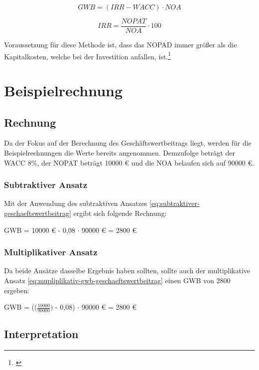 \begin{equation}
    GWB = (IRR - WACC) \cdot NOA
    \label{eq:mupliplikativ-gwb-geschaeftswertbeitrag}
\end{equation}

\begin{equation}
    IRR = \frac{NOPAT}{NOA} \cdot 100
    \label{eq:mupliplikativ-irr-geschaeftswertbeitrag}
\end{equation}

\bigskip

\noindent
Voraussetzung für diese Methode ist, dass das NOPAD immer größer als die Kapitalkosten, welche bei der Investition anfallen, ist.\footnote{\cite{bwllexicon-eva}}

\section{Beispielrechnung}

\subsection{Rechnung}

Da der Fokus auf der Berechnung des Geschäftswertbeitrags liegt, werden für die Beispielrechnungen die Werte bereits angenommen. Demzufolge beträgt der WACC 8\%, der NOPAT beträgt 10000 € und die NOA belaufen sich auf 90000 €.

\subsubsection{Subtraktiver Ansatz}

Mit der Anwendung des subtraktiven Ansatzes \eqref{eq:subtraktiver-geschaeftswertbeitrag} ergibt sich folgende Rechnung:

\bigskip
GWB = 10000 € - 0,08 $\cdot$ 90000 € = 2800 €


\subsubsection{Multiplikativer Ansatz}

Da beide Ansätze dasselbe Ergebnis haben sollten, sollte auch der multiplikative Ansatz \eqref{eq:mupliplikativ-gwb-geschaeftswertbeitrag} einen GWB von 2800 ergeben:

\bigskip
GWB = (($\frac{10000}{90000})$ - 0,08) $\cdot$ 90000 € = 2800 €

\subsection{Interpretation}

